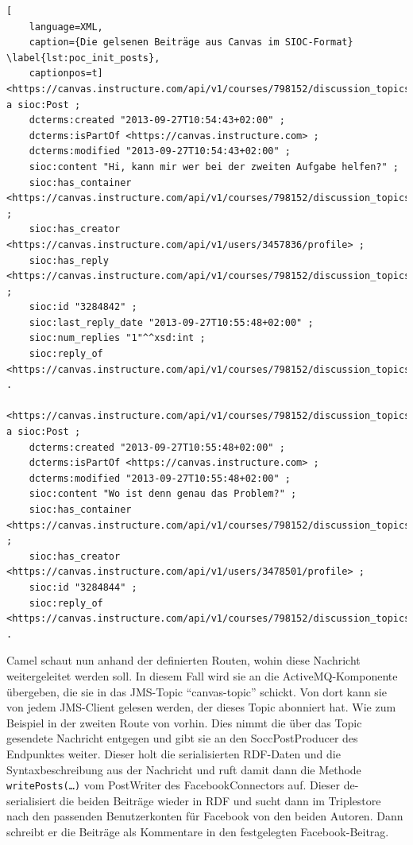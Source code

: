 \begin{lstlisting}[
    language=XML,
    caption={Die gelsenen Beiträge aus Canvas im SIOC-Format} \label{lst:poc_init_posts},
    captionpos=t]
<https://canvas.instructure.com/api/v1/courses/798152/discussion_topics/1540697/entries/3284842> a sioc:Post ;
    dcterms:created "2013-09-27T10:54:43+02:00" ;
    dcterms:isPartOf <https://canvas.instructure.com> ;
    dcterms:modified "2013-09-27T10:54:43+02:00" ;
    sioc:content "Hi, kann mir wer bei der zweiten Aufgabe helfen?" ;
    sioc:has_container <https://canvas.instructure.com/api/v1/courses/798152/discussion_topics/1540697> ;
    sioc:has_creator <https://canvas.instructure.com/api/v1/users/3457836/profile> ;
    sioc:has_reply <https://canvas.instructure.com/api/v1/courses/798152/discussion_topics/1540697/entries/3284844> ;
    sioc:id "3284842" ;
    sioc:last_reply_date "2013-09-27T10:55:48+02:00" ;
    sioc:num_replies "1"^^xsd:int ;
    sioc:reply_of <https://canvas.instructure.com/api/v1/courses/798152/discussion_topics/1540697#discussion_topic> .

<https://canvas.instructure.com/api/v1/courses/798152/discussion_topics/1540697/entries/3284844> a sioc:Post ;
    dcterms:created "2013-09-27T10:55:48+02:00" ;
    dcterms:isPartOf <https://canvas.instructure.com> ;
    dcterms:modified "2013-09-27T10:55:48+02:00" ;
    sioc:content "Wo ist denn genau das Problem?" ;
    sioc:has_container <https://canvas.instructure.com/api/v1/courses/798152/discussion_topics/1540697> ;
    sioc:has_creator <https://canvas.instructure.com/api/v1/users/3478501/profile> ;
    sioc:id "3284844" ;
    sioc:reply_of <https://canvas.instructure.com/api/v1/courses/798152/discussion_topics/1540697/entries/3284842> .
\end{lstlisting}

Camel schaut nun anhand der definierten Routen, wohin diese Nachricht weitergeleitet werden soll. In diesem Fall wird sie an die ActiveMQ-Komponente übergeben, die sie in das JMS-Topic \enquote{canvas-topic} schickt. Von dort kann sie von jedem JMS-Client gelesen werden, der dieses Topic abonniert hat. Wie zum Beispiel in der zweiten Route von vorhin. Dies nimmt die über das Topic gesendete Nachricht entgegen und gibt sie an den SoccPostProducer des Endpunktes weiter. Dieser holt die serialisierten RDF-Daten und die Syntaxbeschreibung aus der Nachricht und ruft damit dann die Methode \texttt{writePosts(\dots)} vom PostWriter des FacebookConnectors auf. Dieser de-serialisiert die beiden Beiträge wieder in RDF und sucht dann im Triplestore nach den passenden Benutzerkonten für Facebook von den beiden Autoren. Dann schreibt er die Beiträge als Kommentare in den festgelegten Facebook-Beitrag.

